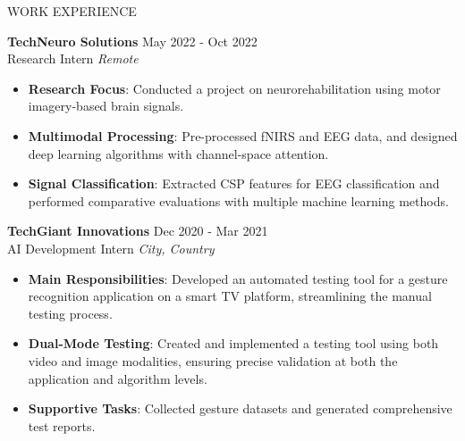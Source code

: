 \documentclass{resume} %
\begin{document}
\begin{rSection}{WORK EXPERIENCE}

\textbf{TechNeuro Solutions} \hfill May 2022 - Oct 2022\\
Research Intern \hfill \textit{Remote}
 \begin{itemize}
    \itemsep -3pt {}
    \item \textbf{Research Focus}: Conducted a project on neurorehabilitation using motor imagery-based brain signals.  
    \item \textbf{Multimodal Processing}: Pre-processed fNIRS and EEG data, and designed deep learning algorithms with channel-space attention.  
    \item \textbf{Signal Classification}: Extracted CSP features for EEG classification and performed comparative evaluations with multiple machine learning methods.
 \end{itemize}


\textbf{TechGiant Innovations} \hfill Dec 2020 - Mar 2021\\
AI Development Intern \hfill \textit{City, Country}
 \begin{itemize}
    \itemsep -3pt {} 
     \item \textbf{Main Responsibilities}: Developed an automated testing tool for a gesture recognition application on a smart TV platform, streamlining the manual testing process.
     \item \textbf{Dual-Mode Testing}: Created and implemented a testing tool using both video and image modalities, ensuring precise validation at both the application and algorithm levels.
    \item \textbf{Supportive Tasks}: Collected gesture datasets and generated comprehensive test reports.
 \end{itemize}

 
\end{rSection} 
\end{document}
